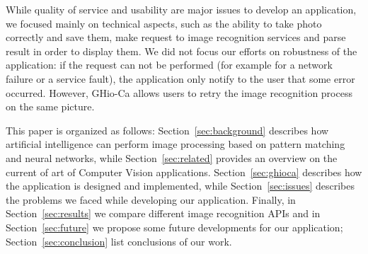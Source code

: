 While quality of service and usability are major issues to develop an 
application, we focused mainly on technical aspects, such as the ability to 
take photo correctly and save them, make request to image recognition services 
and parse result in order to display them. We did not focus our efforts on 
robustness of the application: if the request can not be performed (for example 
for a network failure or a service fault), the application only notify to the 
user that some error occurred. However, GHio-Ca allows users to retry the image 
recognition process on the same picture.

This paper is organized as follows: Section~\ref{sec:background} describes how 
artificial intelligence can perform image processing based on pattern matching 
and neural networks, while Section~\ref{sec:related} provides an overview on the 
current of art of Computer Vision applications. Section~\ref{sec:ghioca} 
describes how the application is designed and implemented, while
Section~\ref{sec:issues} describes the problems we faced while developing our 
application. Finally, in Section~\ref{sec:results} we compare different image 
recognition APIs and in Section~\ref{sec:future} we propose some future 
developments for our application; Section~\ref{sec:conclusion} list conclusions 
of our work.